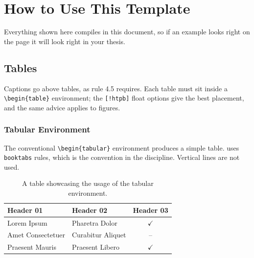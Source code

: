 %
%

\chapter{How to Use This Template}
\label{ch:how-to}

Everything shown here compiles in this document, so if an example looks
right on the page it will look right in your thesis.

\section{Tables}
\label{sec:tables}

Captions go above tables, as rule 4.5 requires. Each table must sit inside
a \verb|\begin{table}| environment; the \verb|[!htpb]| float options give
the best placement, and the same advice applies to figures.

\subsection{Tabular Environment}

The conventional \verb|\begin{tabular}| environment produces a simple
table.  uses \texttt{booktabs} rules, which is the
convention in the discipline. Vertical lines are not used.

\begin{table}[!htpb]
  \caption{A table showcasing the usage of the tabular environment.}
  \label{tab:table-01}
  \centering
  \begin{tabular}{llc}
    \toprule
    \textbf{Header 01} & \textbf{Header 02} & \textbf{Header 03} \\
    \midrule
    Lorem Ipsum       & Pharetra Dolor    & $\checkmark$ \\
    Amet Consectetuer & Curabitur Aliquet & --           \\
    Praesent Mauris   & Praesent Libero   & $\checkmark$ \\
    \bottomrule
  \end{tabular}
\end{table}

